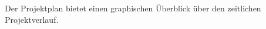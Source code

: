 Der  Projektplan bietet  einen graphischen  \"Uberblick \"uber  den zeitlichen
Projektverlauf.\\


\clearpage
\setlength\paperheight{297mm}
\setlength\paperwidth{420mm}
\setlength\pdfpageheight{\paperheight}
\setlength\pdfpagewidth{\paperwidth}



\setlength\paperheight{297mm}
\setlength\paperwidth{210mm}
\setlength\pdfpageheight{\paperheight}
\setlength\pdfpagewidth{\paperwidth}
